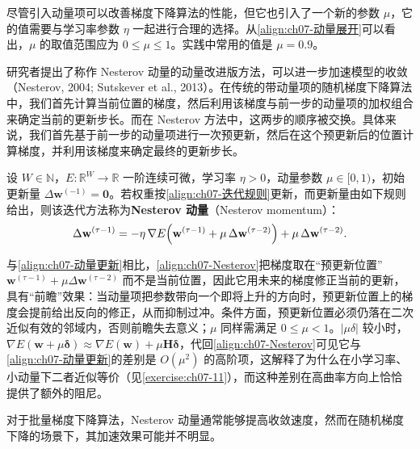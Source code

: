 \documentclass[../../main.tex]{subfiles}
\begin{document}
尽管引入动量项可以改善梯度下降算法的性能，但它也引入了一个新的参数 $\mu$，它的值需要与学习率参数 $\eta$ 一起进行合理的选择。从\eqref{align:ch07-动量展开}可以看出，$\mu$ 的取值范围应为 $0\leqslant\mu\leqslant1$。实践中常用的值是 $\mu=0.9$。

研究者提出了称作 Nesterov 动量的动量改进版方法，可以进一步加速模型的收敛（Nesterov, 2004; Sutskever et al., 2013）。在传统的带动量项的随机梯度下降算法中，我们首先计算当前位置的梯度，然后利用该梯度与前一步的动量项的加权组合来确定当前的更新步长。而在 Nesterov 方法中，这两步的顺序被交换。具体来说，我们首先基于前一步的动量项进行一次预更新，然后在这个预更新后的位置计算梯度，并利用该梯度来确定最终的更新步长。

\begin{definition}[Nesterov 动量]\label{definition:ch07-Nesterov动量}
设 $W\in\mathbb{N}$，$E:\mathbb{R}^{W}\to\mathbb{R}$ 一阶连续可微，学习率 $\eta>0$，动量参数 $\mu\in[0,1)$，初始更新量 $\Delta\mathbf{w}^{(-1)}=\mathbf{0}$。若权重按\eqref{align:ch07-迭代规则}更新，而更新量由如下规则给出，则该迭代方法称为\textbf{Nesterov 动量}（Nesterov momentum）：
\begin{align}
\Delta\mathbf{w}^{(\tau-1)} = -\eta\,\nabla E\Bigl(\mathbf{w}^{(\tau-1)}+\mu\,\Delta\mathbf{w}^{(\tau-2)}\Bigr)+\mu\,\Delta\mathbf{w}^{(\tau-2)}.
\label{align:ch07-Nesterov}
\end{align}
\end{definition}

\begin{remark}
与\eqref{align:ch07-动量更新}相比，\eqref{align:ch07-Nesterov}把梯度取在“预更新位置” $\mathbf{w}^{(\tau-1)}+\mu\Delta\mathbf{w}^{(\tau-2)}$ 而不是当前位置，因此它用未来的梯度修正当前的更新，具有“前瞻”效果：当动量项把参数带向一个即将上升的方向时，预更新位置上的梯度会提前给出反向的修正，从而抑制过冲。条件方面，预更新位置必须仍落在二次近似有效的邻域内，否则前瞻失去意义；$\mu$ 同样需满足 $0\leqslant\mu<1$。$|\mu\delta|$ 较小时，$\nabla E(\mathbf{w}+\mu\boldsymbol{\delta})\approx\nabla E(\mathbf{w})+\mu\mathbf{H}\boldsymbol{\delta}$，代回\eqref{align:ch07-Nesterov}可见它与\eqref{align:ch07-动量更新}的差别是 $O(\mu^{2})$ 的高阶项，这解释了为什么在小学习率、小动量下二者近似等价（见\cref{exercise:ch07-11}），而这种差别在高曲率方向上恰恰提供了额外的阻尼。
\end{remark}

对于批量梯度下降算法，Nesterov 动量通常能够提高收敛速度，然而在随机梯度下降的场景下，其加速效果可能并不明显。
\end{document}
